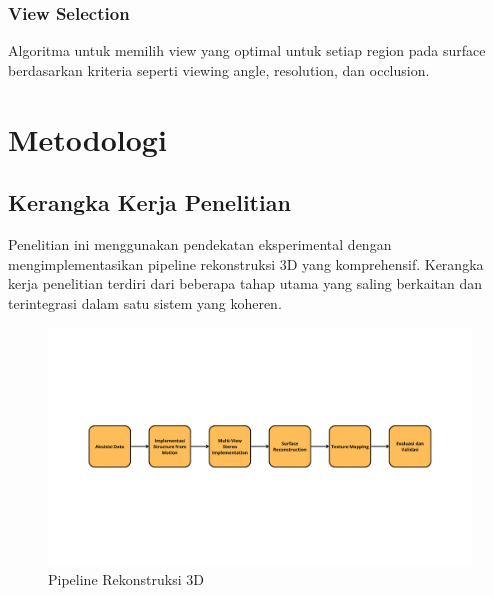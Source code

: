 \documentclass[12pt,a4paper]{article}
\begin{document}
\subsubsection{View Selection}
Algoritma untuk memilih view yang optimal untuk setiap region pada surface berdasarkan kriteria seperti viewing angle, resolution, dan occlusion.




\clearpage

\section{Metodologi}

\subsection{Kerangka Kerja Penelitian}

Penelitian ini menggunakan pendekatan eksperimental dengan mengimplementasikan pipeline rekonstruksi 3D yang komprehensif. Kerangka kerja penelitian terdiri dari beberapa tahap utama yang saling berkaitan dan terintegrasi dalam satu sistem yang koheren.

\begin{figure}[H]
\centering
\includegraphics[width=\textwidth]{metodologi.png}
\caption{Pipeline Rekonstruksi 3D}
\label{fig:pipeline}
\end{figure}
\end{document}
